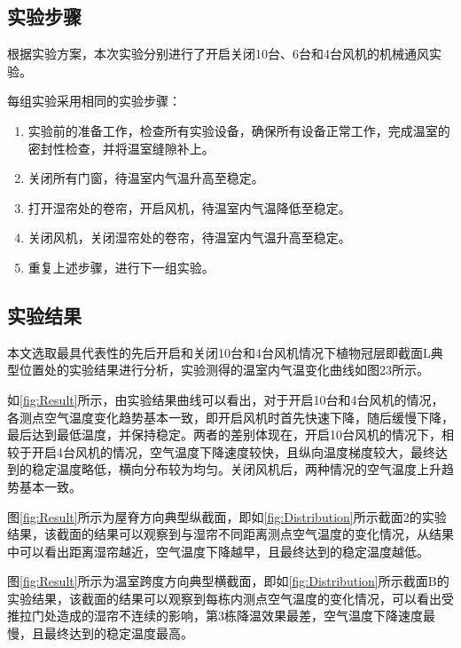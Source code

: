 	\subsection{实验步骤}
根据实验方案，本次实验分别进行了开启关闭10台、6台和4台风机的机械通风实验。
	
每组实验采用相同的实验步骤：
	\begin{enumerate}
		\item 实验前的准备工作，检查所有实验设备，确保所有设备正常工作，完成温室的密封性检查，并将温室缝隙补上。
		\item 关闭所有门窗，待温室内气温升高至稳定。
		\item 打开湿帘处的卷帘，开启风机，待温室内气温降低至稳定。
		\item 关闭风机，关闭湿帘处的卷帘，待温室内气温升高至稳定。
		\item 重复上述步骤，进行下一组实验。
	\end{enumerate}
	
	\subsection{实验结果}
	本文选取最具代表性的先后开启和关闭10台和4台风机情况下植物冠层即截面L典型位置处的实验结果进行分析，实验测得的温室内气温变化曲线如图23所示。
	\begin{figure}[!htp]
		\centering
 	\end{figure}
	如\ref{fig:Result}所示，由实验结果曲线可以看出，对于开启10台和4台风机的情况，各测点空气温度变化趋势基本一致，即开启风机时首先快速下降，随后缓慢下降，最后达到最低温度，并保持稳定。两者的差别体现在，开启10台风机的情况下，相较于开启4台风机的情况，空气温度下降速度较快，且纵向温度梯度较大，最终达到的稳定温度略低，横向分布较为均匀。关闭风机后，两种情况的空气温度上升趋势基本一致。
	
图\ref{fig:Result}所示为屋脊方向典型纵截面，即如\ref{fig:Distribution}所示截面2的实验结果，该截面的结果可以观察到与湿帘不同距离测点空气温度的变化情况，从结果中可以看出距离湿帘越近，空气温度下降越早，且最终达到的稳定温度越低。

图\ref{fig:Result}所示为温室跨度方向典型横截面，即如\ref{fig:Distribution}所示截面B的实验结果，该截面的结果可以观察到每栋内测点空气温度的变化情况，可以看出受推拉门处造成的湿帘不连续的影响，第3栋降温效果最差，空气温度下降速度最慢，且最终达到的稳定温度最高。

